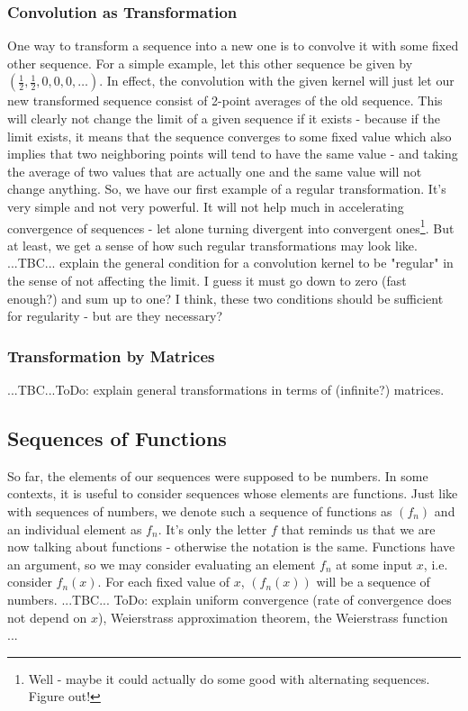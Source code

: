 \subsubsection{Convolution as Transformation}
One way to transform a sequence into a new one is to convolve it with some fixed other sequence. For a simple example, let this other sequence be given by $(\frac{1}{2}, \frac{1}{2}, 0, 0, 0, \ldots)$. In effect, the convolution with the given kernel will just let our new transformed sequence consist of 2-point averages of the old sequence. This will clearly not change the limit of a given sequence if it exists - because if the limit exists, it means that the sequence converges to some fixed value which also implies that two neighboring points will tend to have the same value - and taking the average of two values that are actually one and the same value will not change anything. So, we have our first example of a regular transformation. It's very simple and not very powerful. It will not help much in accelerating convergence of sequences - let alone turning divergent into convergent ones\footnote{Well - maybe it could actually do some good with alternating sequences. Figure out!}. But at least, we get a sense of how such regular transformations may look like. ...TBC... explain the general condition for a convolution kernel to be "regular" in the sense of not affecting the limit. I guess it must go down to zero (fast enough?) and sum up to one? I think, these two conditions should be sufficient for regularity - but are they necessary? 

\subsubsection{Transformation by Matrices} ...TBC...ToDo: explain general transformations in terms of (infinite?) matrices.



\subsection{Sequences of Functions} So far, the elements of our sequences were supposed to be numbers. In some contexts, it is useful to consider sequences whose elements are functions. Just like with sequences of numbers, we denote such a sequence of functions as $(f_n)$ and an individual element as $f_n$. It's only the letter $f$ that reminds us that we are now talking about functions - otherwise the notation is the same. Functions have an argument, so we may consider evaluating an element $f_n$ at some input $x$, i.e. consider $f_n(x)$. For each fixed value of $x$, $(f_n(x))$ will be a sequence of numbers. ...TBC... ToDo: explain uniform convergence (rate of convergence does not depend on $x$), Weierstrass approximation theorem, the Weierstrass function ...

